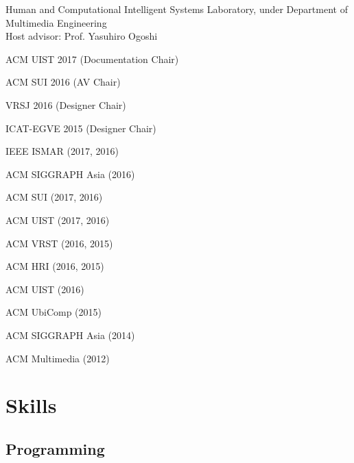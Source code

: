 \documentclass[]{resume-enhanced}
\begin{document}
\begin{minipage}[t]{0.55\textwidth}
\vspace{\topsep} %
Human and Computational Intelligent Systems Laboratory, under Department of Multimedia Engineering \\
Host advisor: Prof. Yasuhiro Ogoshi
\sectionsep

\end{minipage} 
\hfill
\begin{minipage}[t]{0.40\textwidth} 
	
\descript{ }
\begin{tightemize}
\item ACM UIST 2017 (Documentation Chair)
\item ACM SUI 2016 (AV Chair)
\item VRSJ 2016 (Designer Chair)
\item ICAT-EGVE 2015 (Designer Chair)
\end{tightemize}

\begin{tightemize}
\item IEEE ISMAR (2017, 2016)
\item ACM SIGGRAPH Asia (2016)
\item ACM SUI (2017, 2016)
\item ACM UIST (2017, 2016)
\item ACM VRST (2016, 2015)
\item ACM HRI (2016, 2015)
\end{tightemize}

\begin{tightemize}
	\item ACM UIST (2016)
	\item ACM UbiComp (2015)
	\item ACM SIGGRAPH Asia (2014)
	\item ACM Multimedia (2012)
\end{tightemize}
\sectionsep


\section{Skills}
\subsection{Programming}


\end{minipage}
\end{document}
